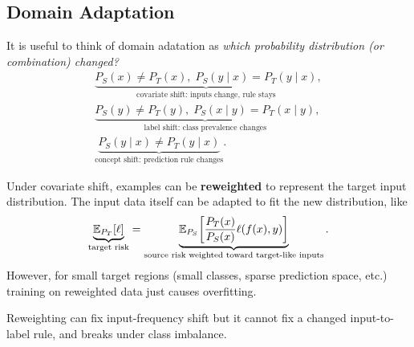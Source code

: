 \subsection{Domain Adaptation}
\label{sec:adaptation-domain-adaptation-the-data-distribution-changes}
It is useful to think of domain adatation as \textit{which probability distribution (or combination) changed?}
\begin{align}
    \underbrace{P_S(x)\ne P_T(x),\;P_S(y\mid x)=P_T(y\mid x)}_{\text{covariate shift: inputs change, rule stays}},\\
    \underbrace{P_S(y)\ne P_T(y),\;P_S(x\mid y)=P_T(x\mid y)}_{\text{label shift: class prevalence changes}},\\
    \underbrace{P_S(y\mid x)\ne P_T(y\mid x)}_{\text{concept shift: prediction rule changes}}.
\end{align}

Under covariate shift, examples can be \textbf{reweighted} to represent the target input distribution.
The input data itself can be adapted to fit the new distribution, like
\[
    \underbrace{\mathbb E_{P_T}[\ell]}_{\text{target risk}}
    =
    \underbrace{\mathbb E_{P_S}\!\left[
    \frac{P_T(x)}{P_S(x)}\ell(f(x),y)
    \right]}_{\text{source risk weighted toward target-like inputs}}.
\]
However, for small target regions (small classes, sparse prediction space, etc.) training on reweighted data just causes overfitting.


\begin{calloutmemoryhook}
    Reweighting can fix input-frequency shift but it cannot fix a changed input-to-label rule, and breaks under class imbalance.
\end{calloutmemoryhook}

